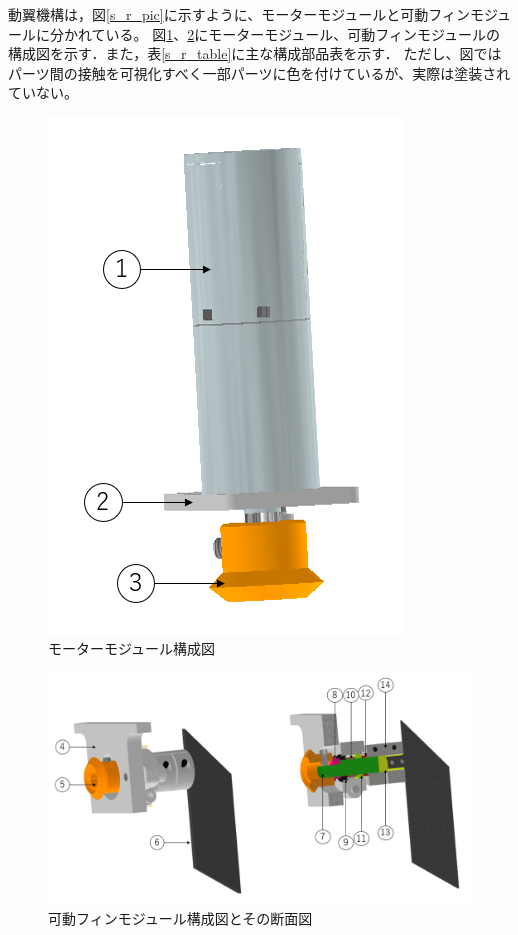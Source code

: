 \documentclass[a4paper,11pt,titlepage,uplatex]{jsarticle}
\begin{document}
\subsubsection{}
動翼機構は，図\ref{s_r_pic}に示すように、モーターモジュールと可動フィンモジュールに分かれている。
図\ref{s_r_motorCAD}、\ref{s_r_finCAD}にモーターモジュール、可動フィンモジュールの構成図を示す．また，表\ref{s_r_table}に主な構成部品表を示す．
ただし、図ではパーツ間の接触を可視化すべく一部パーツに色を付けているが、実際は塗装されていない。

\begin{figure}[H]
    \centering
    \includegraphics[scale = 0.5]{pic_str/s_r_motorCAD.png}
    \caption{モーターモジュール構成図}
    \label{s_r_motorCAD}
\end{figure}

\begin{figure}[H]
    \centering
    \includegraphics[scale = 0.5]{pic_str/s_r_finCAD.png}
    \caption{可動フィンモジュール構成図とその断面図}
    \label{s_r_finCAD}
\end{figure}
\end{document}
